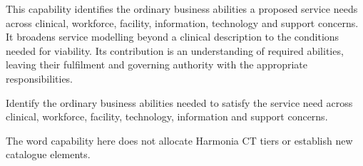 This capability identifies the ordinary business abilities a proposed service needs across clinical, workforce, facility, information, technology and support concerns. It broadens service modelling beyond a clinical description to the conditions needed for viability. Its contribution is an understanding of required abilities, leaving their fulfilment and governing authority with the appropriate responsibilities.



Identify the ordinary business abilities needed to satisfy the service need across clinical, workforce, facility, technology, information and support concerns.



The word capability here does not allocate Harmonia CT tiers or establish new catalogue elements.


